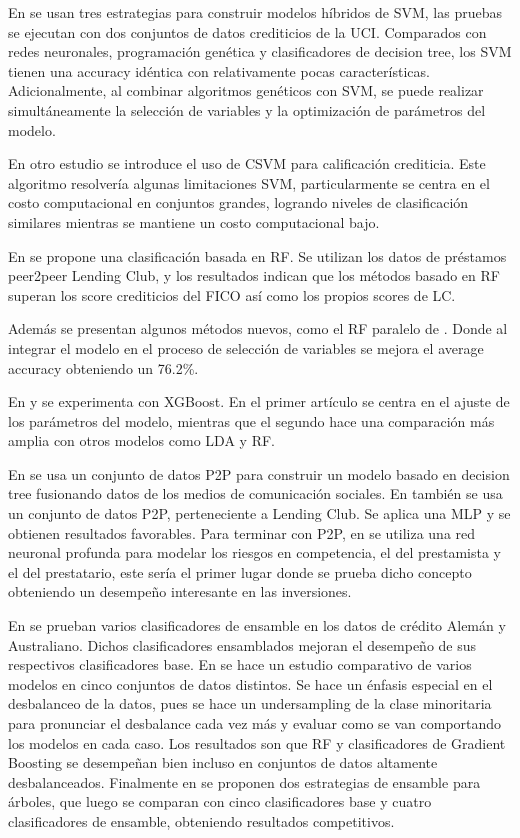 En \cite{huang2007credit} se usan tres estrategias para construir modelos híbridos de \ac{SVM}, las pruebas se ejecutan con dos conjuntos de datos crediticios de la UCI. Comparados con redes neuronales, programación genética y clasificadores de decision tree, los \ac{SVM} tienen una accuracy idéntica con relativamente pocas características. Adicionalmente, al combinar algoritmos genéticos con \ac{SVM}, se puede realizar simultáneamente la selección de variables y la optimización de parámetros del modelo. 

En otro estudio \cite{harris2015credit} se introduce el uso de \ac{CSVM} para calificación crediticia. Este algoritmo resolvería algunas limitaciones \ac{SVM}, particularmente se centra en el costo computacional en conjuntos grandes, logrando niveles de clasificación similares mientras se mantiene un costo computacional bajo.

En \cite{malekipirbazari2015risk} se propone una clasificación basada en \ac{RF}. Se utilizan los datos de préstamos peer2peer Lending Club, y los resultados indican que los métodos basado en \ac{RF} superan los score crediticios del FICO así como los propios scores de LC.

Además se presentan algunos métodos nuevos, como el \ac{RF} paralelo de \cite{van2016novel}. Donde al integrar el modelo en el proceso de selección de variables se mejora el average accuracy obteniendo un 76.2\%.

En \cite{xia2017boosted} y \cite{bhatia2017credit} se experimenta con \ac{XGBoost}. En el primer artículo se centra en el ajuste de los parámetros del modelo, mientras que el segundo hace una comparación más amplia con otros modelos como \ac{LDA} y \ac{RF}.

En \cite{zhang2016research} se usa un conjunto de datos P2P para construir un modelo basado en decision tree fusionando datos de los medios de comunicación sociales. En \cite{zang2014credit} también se usa un conjunto de datos P2P, perteneciente a Lending Club. Se aplica una \ac{MLP} y se obtienen resultados favorables. Para terminar con P2P, en \cite{tan2018deep} se utiliza una red neuronal profunda para modelar los riesgos en competencia, el del prestamista y el del prestatario, este sería el primer lugar donde se prueba dicho concepto obteniendo un desempeño interesante en las inversiones.

En \cite{nanni2009experimental} se prueban varios clasificadores de ensamble en los datos de crédito Alemán y Australiano. Dichos clasificadores ensamblados mejoran el desempeño de sus respectivos clasificadores base. En \cite{brown2012experimental} se hace un estudio comparativo de varios modelos en cinco conjuntos de datos distintos. Se hace un énfasis especial en el desbalanceo de la datos, pues se hace un undersampling de la clase minoritaria para pronunciar el desbalance cada vez más y evaluar como se van comportando los modelos en cada caso. Los resultados son que \ac{RF} y clasificadores de Gradient Boosting se desempeñan bien incluso en conjuntos de datos altamente desbalanceados. Finalmente en \cite{wang2012two} se proponen dos estrategias de ensamble para árboles, que luego se comparan con cinco clasificadores base y cuatro clasificadores de ensamble, obteniendo resultados competitivos.

